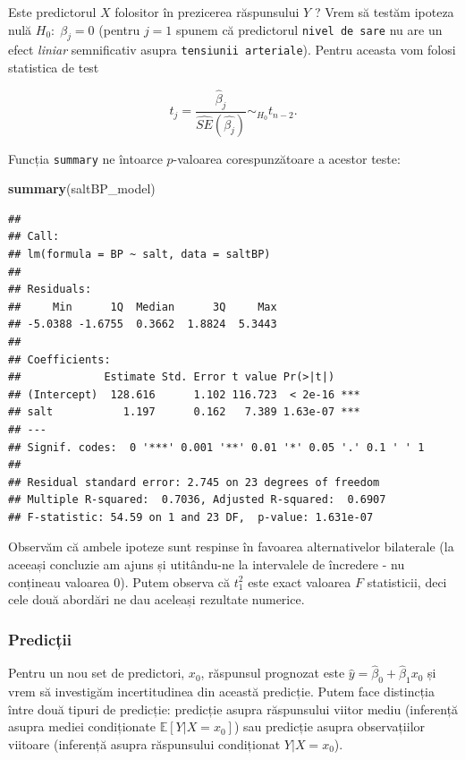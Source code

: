 \documentclass[]{article}
\newenvironment{Shaded}{\begin{snugshade}}{\end{snugshade}}
\newcommand{\KeywordTok}[1]{\textcolor[rgb]{0.13,0.29,0.53}{\textbf{{#1}}}}
\newcommand{\NormalTok}[1]{{#1}}
\begin{document}
Este predictorul \(X\) folositor în prezicerea răspunsului \(Y\) ? Vrem
să testăm ipoteza nulă \(H_0:\;\beta_j=0\) (pentru \(j=1\) spunem că
predictorul \texttt{nivel\ de\ sare} nu are un efect \emph{liniar}
semnificativ asupra \texttt{tensiunii\ arteriale}). Pentru aceasta vom
folosi statistica de test

\[
t_j = \frac{\hat{\beta}_j}{\hat{SE}(\hat{\beta_j})}\sim_{H_0} t_{n-2}.
\]

Funcția \texttt{summary} ne întoarce \(p\)-valoarea corespunzătoare a
acestor teste:

\begin{Shaded}
\begin{Highlighting}[]
\KeywordTok{summary}\NormalTok{(saltBP_model)}
\end{Highlighting}
\end{Shaded}

\begin{verbatim}
## 
## Call:
## lm(formula = BP ~ salt, data = saltBP)
## 
## Residuals:
##     Min      1Q  Median      3Q     Max 
## -5.0388 -1.6755  0.3662  1.8824  5.3443 
## 
## Coefficients:
##             Estimate Std. Error t value Pr(>|t|)    
## (Intercept)  128.616      1.102 116.723  < 2e-16 ***
## salt           1.197      0.162   7.389 1.63e-07 ***
## ---
## Signif. codes:  0 '***' 0.001 '**' 0.01 '*' 0.05 '.' 0.1 ' ' 1
## 
## Residual standard error: 2.745 on 23 degrees of freedom
## Multiple R-squared:  0.7036, Adjusted R-squared:  0.6907 
## F-statistic: 54.59 on 1 and 23 DF,  p-value: 1.631e-07
\end{verbatim}

Observăm că ambele ipoteze sunt respinse în favoarea alternativelor
bilaterale (la aceeași concluzie am ajuns și utitându-ne la intervalele
de încredere - nu conțineau valoarea \(0\)). Putem observa că \(t_1^2\)
este exact valoarea \(F\) statisticii, deci cele două abordări ne dau
aceleași rezultate numerice.

\subsubsection{Predicții}\label{predictii}

Pentru un nou set de predictori, \(x_0\), răspunsul prognozat este
\(\hat{y} = \hat{\beta}_0+\hat{\beta}_1 x_0\) și vrem să investigăm
incertitudinea din această predicție. Putem face distincția între două
tipuri de predicție: predicție asupra răspunsului viitor mediu
(inferență asupra mediei condiționate \(\mathbb{E}[Y|X=x_0]\)) sau
predicție asupra observațiilor viitoare (inferență asupra răspunsului
condiționat \(Y|X=x_0\)).
\end{document}

